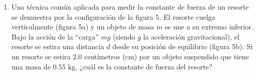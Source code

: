 \documentclass{article}
\begin{document}
\begin{enumerate}

\item Una técnica común aplicada para medir la constante de fuerza de un resorte se demuestra por la configuración de la figura 5. El resorte cuelga verticalmente (figura 5a) y un objeto de masa $m$ se une a su extremo inferior. Bajo la acción de la “carga” $mg$ (siendo $g$ la aceleración gravitacional), el resorte se estira una distancia $d$ desde su posición de equilibrio (figura 5b). Si un resorte se estira $2$.$0$ centímetros (cm) por un objeto suspendido que tiene una masa de $0$.$55$ kg, ¿cuál es la constante de fuerza del resorte?


\end{enumerate}
\end{document}
